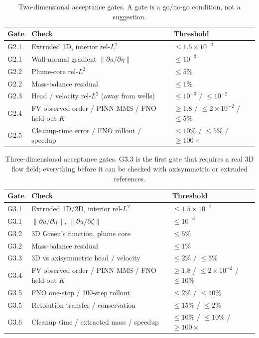 \documentclass[11pt]{article}
\newcommand{\norm}[1]{\left\lVert #1 \right\rVert}
\newcommand{\tabhead}[1]{\textbf{#1}}
\begin{document}
\begin{table}[htbp]
\centering
\small
\begin{tabularx}{\textwidth}{@{}lYl@{}}
\toprule
\tabhead{Gate} & \tabhead{Check} & \tabhead{Threshold}\\
\midrule
G2.1 & Extruded 1D, interior rel-$L^2$ & $\le 1.5\times10^{-2}$\\
G2.1 & Wall-normal gradient $\norm{\partial u/\partial\eta}$ & $\le 10^{-3}$\\
G2.2 & Plume-core rel-$L^2$ & $\le 5\%$\\
G2.2 & Mass-balance residual & $\le 1\%$\\
G2.3 & Head / velocity rel-$L^2$ (away from wells) & $\le 10^{-3}$ / $\le 10^{-2}$\\
G2.4 & FV observed order / PINN MMS / FNO held-out $K$ & $\ge 1.8$ / $\le 2\times10^{-2}$ / $\le 5\%$\\
G2.5 & Cleanup-time error / FNO rollout / speedup & $\le 10\%$ / $\le 5\%$ / $\ge 100\times$\\
\bottomrule
\end{tabularx}
\caption{Two-dimensional acceptance gates.  A gate is a go/no-go condition,
not a suggestion.}
\label{tab:gates2d}
\end{table}

\begin{table}[htbp]
\centering
\small
\begin{tabularx}{\textwidth}{@{}lYl@{}}
\toprule
\tabhead{Gate} & \tabhead{Check} & \tabhead{Threshold}\\
\midrule
G3.1 & Extruded 1D/2D, interior rel-$L^2$ & $\le 1.5\times10^{-2}$\\
G3.1 & $\norm{\partial u/\partial\eta}$, $\norm{\partial u/\partial\zeta}$ & $\le 10^{-3}$\\
G3.2 & 3D Green's function, plume core & $\le 5\%$\\
G3.2 & Mass-balance residual & $\le 1\%$\\
G3.3 & 3D vs axisymmetric head / velocity & $\le 2\%$ / $\le 5\%$\\
G3.4 & FV observed order / PINN MMS / FNO held-out $K$ & $\ge 1.8$ / $\le 2\times10^{-2}$ / $\le 10\%$\\
G3.5 & FNO one-step / 100-step rollout & $\le 2\%$ / $\le 10\%$\\
G3.5 & Resolution transfer / conservation & $\le 15\%$ / $\le 2\%$\\
G3.6 & Cleanup time / extracted mass / speedup & $\le 10\%$ / $\le 10\%$ / $\ge 100\times$\\
\bottomrule
\end{tabularx}
\caption{Three-dimensional acceptance gates.  G3.3 is the first gate that
requires a real 3D flow field; everything before it can be checked with
axisymmetric or extruded references.}
\label{tab:gates3d}
\end{table}
\end{document}
